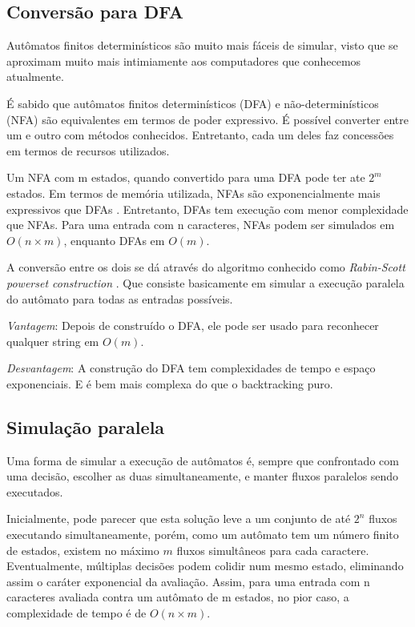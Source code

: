 \documentclass[a4paper,12pt,oneside,onecolumn]{uerj}
\begin{document}
\subsection{Conversão para DFA}

Autômatos finitos determinísticos são muito mais fáceis de simular, visto que se aproximam muito mais intimiamente aos computadores que conhecemos atualmente. 

É sabido que autômatos finitos determinísticos (DFA) e não-determinísticos (NFA) são equivalentes em termos de poder expressivo. É possível converter entre um e outro com métodos conhecidos. Entretanto, cada um deles faz concessões em termos de recursos utilizados.

Um NFA com m estados, quando convertido para uma DFA pode ter ate $2^m$ estados. Em termos de memória utilizada, NFAs são exponencialmente mais expressivos que DFAs \cite{bib:Calabro05}. Entretanto, DFAs tem execução com menor complexidade que NFAs. Para uma entrada com n caracteres, NFAs podem ser simulados em $O(n \times m)$, enquanto DFAs em $O(m)$.

A conversão entre os dois se dá através do algoritmo conhecido como \emph{Rabin-Scott powerset construction} \cite{bib:Rabin59}. Que consiste basicamente em simular a execução paralela do autômato para todas as entradas possíveis.

\emph{Vantagem}: Depois de construído o DFA, ele pode ser usado para reconhecer qualquer string em $O(m)$.

\emph{Desvantagem}: A construção do DFA tem complexidades de tempo e espaço exponenciais. E é bem mais complexa do que o backtracking puro.

\subsection{Simulação paralela}

Uma forma de simular a execução de autômatos é, sempre que confrontado com uma decisão, escolher as duas simultaneamente, e manter fluxos paralelos sendo executados. 

Inicialmente, pode parecer que esta solução leve a um conjunto de até $2^n$ fluxos executando simultaneamente, porém, como um autômato tem um número finito de estados, existem no máximo $m$ fluxos simultâneos para cada caractere. Eventualmente, múltiplas decisões podem colidir num mesmo estado, eliminando assim o caráter exponencial da avaliação. Assim, para uma entrada com n caracteres avaliada contra um autômato de m estados, no pior caso, a complexidade de tempo é de $O(n \times m)$.
\end{document}
